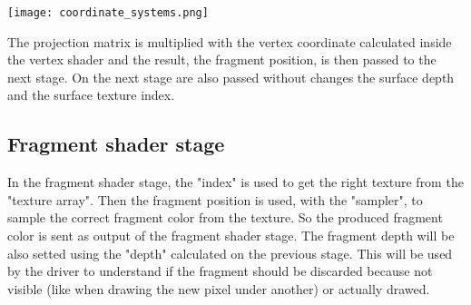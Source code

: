 \begin{center}
	\texttt{[image: coordinate\_systems.png]}
\end{center}
The projection matrix is multiplied with the vertex coordinate calculated inside the vertex shader and the result, the fragment position, is then passed to the next stage.
On the next stage are also passed without changes the surface depth and the surface texture index.


\subsection{Fragment shader stage}
In the fragment shader stage, the "index" is used to get the right texture from the "texture array". Then the fragment position is used, with the "sampler", to sample the correct fragment color from the texture. So the produced fragment color is sent as output of the fragment shader stage. The fragment depth will be also setted using the "depth" calculated on the previous stage. This will be used by the driver to understand if the fragment should be discarded because not visible (like when drawing the new pixel under another) or actually drawed.
